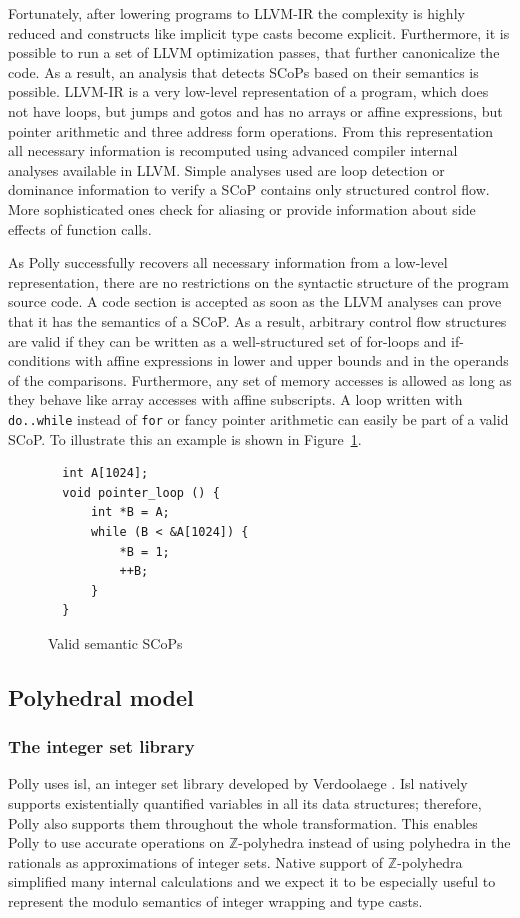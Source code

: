 Fortunately, after lowering programs to LLVM-IR the complexity is highly
reduced and constructs like implicit type casts become explicit. Furthermore,
it is possible to run a set of LLVM optimization passes, that further
canonicalize the code.  As a result, an
analysis that detects SCoPs based on their semantics is possible.  LLVM-IR is a
very low-level representation of a program, which does not have loops, but
jumps and gotos and has no arrays or affine expressions, but pointer arithmetic
and three address form operations. From this representation all necessary
information is recomputed using advanced compiler internal analyses available
in LLVM. Simple analyses used are loop detection or dominance information to
verify a SCoP contains only structured control flow. More sophisticated ones
check for aliasing or provide information about side effects of
function calls. 

As Polly successfully recovers all necessary information from a low-level
representation, there are no restrictions on the syntactic structure of the
program source code. A code section is accepted as soon as the LLVM analyses
can prove that it has the semantics of a SCoP. As a result, 
arbitrary control
flow structures are valid if they can be written as a well-structured set
of for-loops and if-conditions with affine expressions in lower and upper
bounds and in the operands of the comparisons. Furthermore, any set of
memory accesses is allowed as long as they behave like array accesses with affine subscripts.
A loop written
with \texttt{do..while} instead of \texttt{for} or fancy pointer arithmetic can easily be part of a valid SCoP.
To illustrate this an example is shown in Figure~\ref{semscop}.

\begin{figure}
\begin{verbatim}
  int A[1024];
  void pointer_loop () {
      int *B = A;
      while (B < &A[1024]) {
          *B = 1;
          ++B;
      }
  }
\end{verbatim}
\caption{Valid semantic SCoPs}
\label{semscop}
\end{figure}

\subsection{Polyhedral model}

\subsubsection{The integer set library} Polly uses isl, an integer set library
developed by Verdoolaege \cite{Verdoolaege10}. Isl natively supports
existentially quantified variables in all its data structures; therefore, Polly
also supports them throughout the whole transformation. This enables Polly to
use accurate operations on $\mathbb{Z}$-polyhedra instead of using polyhedra
in the rationals as approximations of integer sets.
Native support of $\mathbb{Z}$-polyhedra
simplified many internal calculations and we
expect it to be especially useful to represent the modulo semantics of integer
wrapping and type casts.


